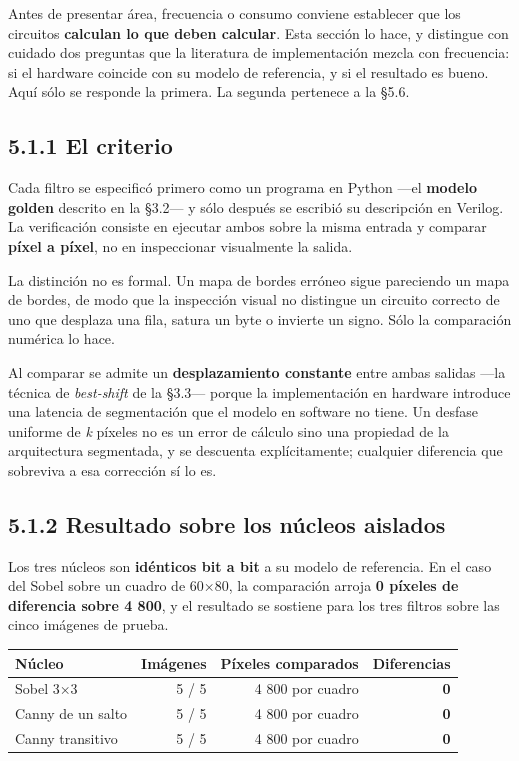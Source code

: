 Antes de presentar área, frecuencia o consumo conviene establecer que
los circuitos \textbf{calculan lo que deben calcular}. Esta sección lo
hace, y distingue con cuidado dos preguntas que la literatura de
implementación mezcla con frecuencia: si el hardware coincide con su
modelo de referencia, y si el resultado es bueno. Aquí sólo se responde
la primera. La segunda pertenece a la §5.6.

\subsection{5.1.1 El criterio}\label{el-criterio}

Cada filtro se especificó primero como un programa en Python ---el
\textbf{modelo golden} descrito en la §3.2--- y sólo después se escribió
su descripción en Verilog. La verificación consiste en ejecutar ambos
sobre la misma entrada y comparar \textbf{píxel a píxel}, no en
inspeccionar visualmente la salida.

La distinción no es formal. Un mapa de bordes erróneo sigue pareciendo
un mapa de bordes, de modo que la inspección visual no distingue un
circuito correcto de uno que desplaza una fila, satura un byte o
invierte un signo. Sólo la comparación numérica lo hace.

Al comparar se admite un \textbf{desplazamiento constante} entre ambas
salidas ---la técnica de \emph{best-shift} de la §3.3--- porque la
implementación en hardware introduce una latencia de segmentación que el
modelo en software no tiene. Un desfase uniforme de \emph{k} píxeles no
es un error de cálculo sino una propiedad de la arquitectura segmentada,
y se descuenta explícitamente; cualquier diferencia que sobreviva a esa
corrección sí lo es.

\subsection{5.1.2 Resultado sobre los núcleos
aislados}\label{resultado-sobre-los-nuxfacleos-aislados}

Los tres núcleos son \textbf{idénticos bit a bit} a su modelo de
referencia. En el caso del Sobel sobre un cuadro de 60×80, la
comparación arroja \textbf{0 píxeles de diferencia sobre 4 800}, y el
resultado se sostiene para los tres filtros sobre las cinco imágenes de
prueba.

\begin{longtable}[]{@{}lrrr@{}}
\toprule\noalign{}
Núcleo & Imágenes & Píxeles comparados & Diferencias \\
\midrule\noalign{}
\endhead
\bottomrule\noalign{}
\endlastfoot
Sobel 3×3 & 5 / 5 & 4 800 por cuadro & \textbf{0} \\
Canny de un salto & 5 / 5 & 4 800 por cuadro & \textbf{0} \\
Canny transitivo & 5 / 5 & 4 800 por cuadro & \textbf{0} \\
\end{longtable}

